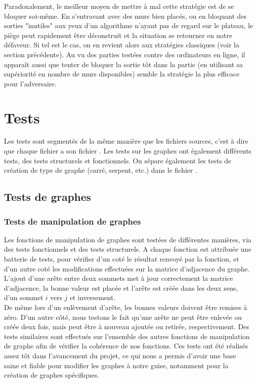 \documentclass[a4paper]{article}
\begin{document}
Paradoxalement, le meilleur moyen de mettre à mal cette stratégie est de se bloquer soi-même. En s'entravant avec des murs bien placés, ou en bloquant des sorties "inutiles" aux yeux d'un algorithme n'ayant pas de regard sur le plateau, le piège peut rapidement être déconstruit et la situation se retourner en notre défaveur. Si tel est le cas, on en revient alors aux stratégies classiques (voir la section précédente). Au vu des parties testées contre des ordinateurs en ligne, il apparaît aussi que tenter de bloquer la sortie tôt dans la partie (en utilisant sa supériorité en nombre de murs disponibles) semble la stratégie la plus efficace pour l'adversaire.

 

\section{Tests}

Les tests sont segmentés de la même manière que les fichiers sources, c'est à dire que chaque fichier  a son fichier . Les tests sur les graphes ont également différents tests, des tests structurels et fonctionnels. On sépare également les tests de création de type de graphe (carré, serpent, etc.) dans le fichier .

\subsection{Tests de graphes}
\subsubsection{Tests de manipulation de graphes}
Les fonctions de manipulation de graphes sont testées de différentes manières, via des tests fonctionnels et des tests structurels. A chaque fonction est attribuée une batterie de tests, pour vérifier d'un coté le résultat renvoyé par la fonction, et d'un autre coté les modifications effectuées sur la matrice d'adjacence du graphe. L'ajout d'une arête entre deux sommets met à jour correctement la matrice d'adjacence, la bonne valeur est placée et l'arête est créée dans les deux sens, d'un sommet $i$ vers $j$ et inversement. \\

De même lors d'un enlèvement d'arête, les bonnes valeurs doivent être remises à zéro. D'un autre côté, nous testons le fait qu'une arête ne peut être enlevée ou créée deux fois, mais peut être à nouveau ajoutée ou retirée, respectivement. Des tests similaires sont effectués sur l'ensemble des autres fonctions de manipulation de graphe afin de vérifier la cohérence de nos fonctions. Ces tests ont été réalisés assez tôt dans l'avancement du projet, ce qui nous a permis d'avoir une base saine et fiable pour modifier les graphes à notre guise, notamment pour la création de graphes spécifiques. \\
\end{document}
